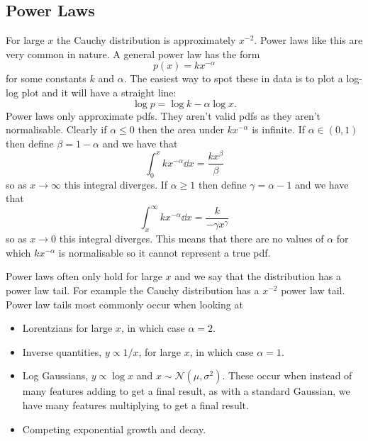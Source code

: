 \documentclass[a4paper]{article}
\newcommand{\normal}{\mathcal{N}}
\begin{document}
    \subsection{Power Laws}
    For large \(x\) the Cauchy distribution is approximately \(x^{-2}\).
    Power laws like this are very common in nature.
    A general power law has the form
    \[p(x) = kx^{-\alpha}\]
    for some constants \(k\) and \(\alpha\).
    The easiest way to spot these in data is to plot a log-log plot and it will have a straight line:
    \[\log p = \log k - \alpha \log x.\]
    Power laws only approximate \glspl{pdf}.
    They aren't valid \glspl{pdf} as they aren't normalisable.
    Clearly if \(\alpha \le 0\) then the area under \(kx^{-\alpha}\) is infinite.
    If \(\alpha \in (0, 1)\) then define \(\beta = 1 - \alpha\) and we have that
    \[\int_0^x kx^{-\alpha} \dd{x} = \frac{kx^\beta}{\beta}\]
    so as \(x\to\infty\) this integral diverges.
    If \(\alpha \ge 1\) then define \(\gamma = \alpha - 1\) and we have that
    \[\int_{x}^{\infty} kx^{-\alpha} \dd{x} = \frac{k}{-\gamma x^\gamma}\]
    so as \(x\to 0\) this integral diverges.
    This means that there are no values of \(\alpha\) for which \(kx^{-\alpha}\) is normalisable so it cannot represent a true \gls{pdf}.
    
    Power laws often only hold for large \(x\) and we say that the distribution has a power law tail.
    For example the Cauchy distribution has a \(x^{-2}\) power law tail.
    Power law tails most commonly occur when looking at
    \begin{itemize}
        \item Lorentzians for large \(x\), in which case \(\alpha = 2\).
        \item Inverse quantities, \(y \propto 1/x\), for large \(x\), in which case \(\alpha = 1\).
        \item Log Gaussians, \(y\propto\log x\) and \(x\sim\normal(\mu, \sigma^2)\).
        These occur when instead of many features adding to get a final result, as with a standard Gaussian, we have many features multiplying to get a final result.
        \item Competing exponential growth and decay.
    \end{itemize}
    
\end{document}
